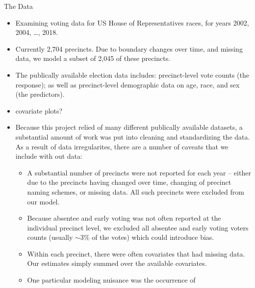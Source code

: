 \documentclass[final]{beamer}
\newlength{\colwidside}
\begin{document}
\begin{frame}[t]
\begin{columns}[t]
\begin{column}{\colwidside}
\begin{block}{The Data}  
  \begin{itemize}
    \item Examining voting data for US House of Representatives races,
      for years 2002, 2004, \ldots, 2018. 
    \item Currently 2,704 precincts. Due to boundary changes over time, and
      missing data, we model a subset of 2,045 of these precincts.
    \item The publically available election data includes:
      precinct-level vote counts (the response); as well as
      precinct-level demographic data on age, race, and sex (the predictors).   
    \item \begin{center}\Large{covariate plots?}\end{center}
    \item Because this project relied of many different publically available
      datasets, a substantial amount of work was put into cleaning and
      standardizing the data. As a result of data irregularites, there
      are a number of caveats that we include with out data:
      \begin{itemize}
        \item A substantial number of precincts were not reported for
          each year -- either due to the precincts having changed over
          time, changing of precinct naming schemes, or missing
          data. All such precincts were excluded from our model.
        \item Because absentee and early voting was not often reported
          at the individual precinct level, we excluded all absentee
          and early voting voters counts (usually $\sim 3\%$ of the votes)
          which could introduce bias.
        \item Within each precinct, there were often covariates that
          had missing data. Our estimates simply summed over the
          available covariates.
        \item One particular modeling nuisance was the occurrence of

\end{itemize}
\end{itemize}
\end{block}
\end{column}
\end{columns}
\end{frame}
\end{document}

